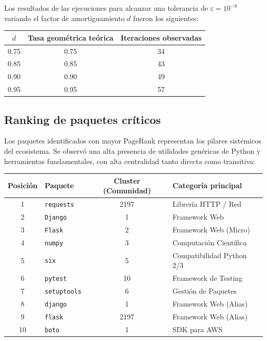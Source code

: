 Los resultados de las ejecuciones para alcanzar una tolerancia de $\varepsilon = 10^{-8}$ variando el factor de amortiguamiento $d$ fueron los siguientes:

\begin{center}
\begin{tabular}{ccc}
\toprule
$d$ & Tasa geométrica teórica & Iteraciones observadas \\
\midrule
0.75 & 0.75 & 34 \\
0.85 & 0.85 & 43 \\
0.90 & 0.90 & 49 \\
0.95 & 0.95 & 57 \\
\bottomrule
\end{tabular}
\end{center}

\subsection{Ranking de paquetes críticos}
Los paquetes identificados con mayor PageRank representan los pilares sistémicos del ecosistema. Se observó una alta presencia de utilidades genéricas de Python y herramientas fundamentales, con alta centralidad tanto directa como transitiva:

\begin{center}
\begin{tabular}{clcl}
\toprule
\textbf{Posición} & \textbf{Paquete} & \textbf{Cluster (Comunidad)} & \textbf{Categoría principal} \\
\midrule
1  & \texttt{requests} & 2197 & Librería HTTP / Red \\
2  & \texttt{Django} & 1 & Framework Web \\
3  & \texttt{Flask} & 2 & Framework Web (Micro) \\
4  & \texttt{numpy} & 3 & Computación Científica \\
5  & \texttt{six} & 5 & Compatibilidad Python 2/3 \\
6  & \texttt{pytest} & 10 & Framework de Testing \\
7  & \texttt{setuptools} & 6 & Gestión de Paquetes \\
8  & \texttt{django} & 1 & Framework Web (Alias) \\
9  & \texttt{flask} & 2197 & Framework Web (Alias) \\
10 & \texttt{boto} & 1 & SDK para AWS \\
\bottomrule
\end{tabular}
\end{center}

